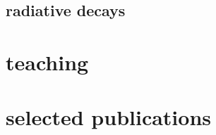 \documentclass[]{friggeri-cv}
\begin{document}
\subsection{radiative decays}

\begin{entrylist}
\end{entrylist}

\section{teaching}

\section{selected publications}


\end{document}
